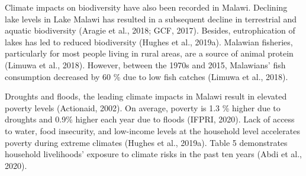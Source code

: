 \documentclass[
]{book}
\begin{document}
Climate impacts on biodiversity have also been recorded in Malawi. Declining lake levels in Lake Malawi has resulted in a subsequent decline in terrestrial and aquatic biodiversity (Aragie et al., 2018; GCF, 2017). Besides, eutrophication of lakes has led to reduced biodiversity (Hughes et al., 2019a). Malawian fisheries, particularly for most people living in rural areas, are a source of animal protein (Limuwa et al., 2018). However, between the 1970s and 2015, Malawians' fish consumption decreased by 60 \% due to low fish catches (Limuwa et al., 2018).

Droughts and floods, the leading climate impacts in Malawi result in elevated poverty levels (Actionaid, 2002). On average, poverty is 1.3 \% higher due to droughts and 0.9\% higher each year due to floods (IFPRI, 2020). Lack of access to water, food insecurity, and low-income levels at the household level accelerates poverty during extreme climates (Hughes et al., 2019a). Table 5 demonstrates household livelihoods' exposure to climate risks in the past ten years (Abdi et al., 2020).

\providecommand{\docline}[3]{\noalign{\global\setlength{\arrayrulewidth}{#1}}\arrayrulecolor[HTML]{#2}\cline{#3}}

\setlength{\tabcolsep}{2pt}

\renewcommand*{\arraystretch}{1.5}
\end{document}
